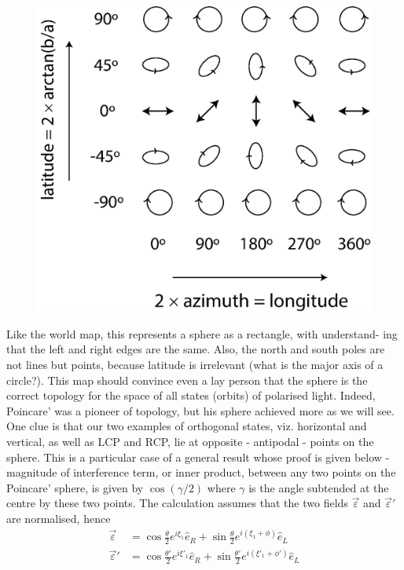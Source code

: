 \begin{figure}[H]
\centering
\includegraphics[scale=0.21]{src/images/chap26/6.jpg}
\end{figure}

Like the world map, this represents a sphere as a rectangle, with understand-
ing that the left and right edges are the same. Also, the north and south poles
are not lines but points, because latitude is irrelevant (what is the major axis of
a circle?). This map should convince even a lay person that the sphere is the
correct topology for the space of all states (orbits) of polarised light. Indeed,
Poincare’ was a pioneer of topology, but his sphere achieved more as we will
see. One clue is that our two examples of orthogonal states, viz. horizontal and
vertical, as well as LCP and RCP, lie at opposite - antipodal - points on the
sphere. This is a particular case of a general result whose proof is given below
- magnitude of interference term, or inner product, between any two points on
the Poincare' sphere, is given by $\cos(\gamma/2)$ where $\gamma$ is the angle subtended at the
centre by these two points. The calculation assumes that the two fields $\overrightarrow{\varepsilon}$ and
$\overrightarrow{\varepsilon}'$ are normalised, hence
\begin{align*}
\overrightarrow{\varepsilon} & = \cos \frac{\theta}{2} e^{i \xi_1} \hat{e}_R + \sin \frac{\theta}{2} e^{i(\xi_1+ \phi)} \hat{e}_L\\
\overrightarrow{\varepsilon}' & = \cos \frac{\theta'}{2} e^{i \xi'_1} \hat{e}_R + \sin \frac{\theta'}{2} e^{i (\xi'_1 + \phi')} \hat{e}_L
\end{align*}

